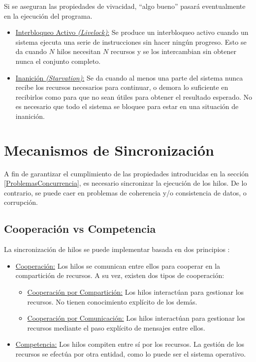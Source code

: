 Si se aseguran las propiedades de vivacidad, ``algo bueno'' pasará eventualmente
en la ejecución del programa.

\begin{itemize}
    \item \underline{Interbloqueo Activo \textit{(Livelock)}:} Se produce un
    interbloqueo activo cuando un sistema ejecuta una serie de instrucciones sin
    hacer ningún progreso. Esto se da cuando $N$ hilos necesitan $N$ recursos
    y se los intercambian sin obtener nunca el conjunto completo.
    \item \underline{Inanición \textit{(Starvation)}:} Se da cuando al menos una
    parte del sistema nunca recibe los recursos necesarios para continuar, o
    demora lo suficiente en recibirlos como para que no sean útiles para obtener
    el resultado esperado. No es necesario que todo el sistema se bloquee para
    estar en una situación de inanición.
\end{itemize}

\section{Mecanismos de Sincronización}

A fin de garantizar el cumplimiento de las propiedades introducidas en la
sección \ref{ProblemasConcurrencia}, es necesario sincronizar la ejecución de
los hilos. De lo contrario, se puede caer en problemas de coherencia
y/o consistencia de datos, o corrupción.

\subsection{Cooperación vs Competencia}

La sincronización de hilos se puede implementar basada en dos principios
\cite{SistOpStallings}:
\begin{itemize}
    \item \underline{Cooperación:} Los hilos se comunican entre ellos para
    cooperar en la compartición de recursos. A su vez, existen dos tipos de
    cooperación:
    \begin{itemize}
        \item \underline{Cooperación por Compartición:} Los hilos interactúan
        para gestionar los recursos. No tienen conocimiento explícito de los demás.
        \item \underline{Cooperación por Comunicación:} Los hilos interactúan
        para gestionar los recursos mediante el paso explícito de mensajes entre
        ellos.
    \end{itemize}
    \item \underline{Competencia:} Los hilos compiten entre sí por los
    recursos. La gestión de los recursos se efectúa por otra entidad, como lo
    puede ser el sistema operativo.
\end{itemize}

